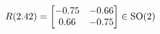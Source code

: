 \documentclass[preview]{standalone}
\begin{document}
\begin{align*}
\special{dvisvgm:raw <g id='unique000'>}R(2.42) = \begin{bmatrix} -0.75 & -0.66 \\ 0.66 & -0.75 \end{bmatrix} \in \text{SO}(2)\special{dvisvgm:raw </g>}
\end{align*}
\end{document}
